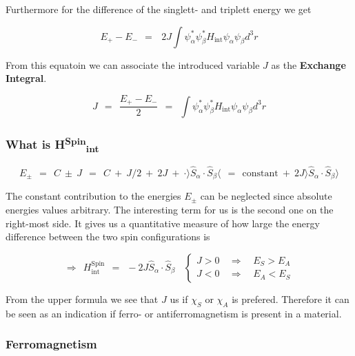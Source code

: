 \documentclass[10pt]{report}
\numberwithin{equation}{chapter}
\begin{document}
Furthermore for the difference of the singlett- and triplett energy we get

\begin{equation}
  E_+ - E_- ~~=~~~2J \int \psi^*_\alpha \psi^*_\beta H_\text{int} \psi_\alpha \psi_\beta d^3r
\end{equation}

From this equatoin we can associate the introduced variable $J$ as the \textbf{Exchange Integral}.

\begin{equation}
  J ~~=~~ \frac{E_+-E_-}{2} ~~=~~ \int \psi^*_\alpha \psi^*_\beta H_\text{int} \psi_\alpha \psi_\beta d^3r
\end{equation}


\subsubsection{What is H\textsuperscript{Spin}\textsubscript{int}}

\begin{equation}
  E_\pm ~~=~~ C ~\pm~ J ~~=~~ C ~+~ J/2 ~+~ 2J ~+~ \cdot \rangle \hat{S}_\alpha \cdot \hat{S}_\beta \langle ~~=~~ \text{constant} ~+~ 2J \rangle \hat{S}_\alpha \cdot \hat{S}_\beta \rangle
\end{equation}

The constant contribution to the energies $E_\pm$ can be neglected since absolute energies values arbitrary. The interesting term for us is the second one on the right-most side. It gives us a quantitative measure of how large the energy difference between the two spin configurations is

\begin{equation}
  \Rightarrow ~~ H^\text{Spin}_\text{int} ~~=~~ - 2J \hat{S}_\alpha \cdot \hat{S}_\beta ~~~~ \left\{
  \begin{array}{lcr}
    J > 0 & ~~ \Rightarrow ~~ & E_S > E_A\\
    J < 0 & ~~ \Rightarrow ~~ & E_A < E_S
  \end{array}\right.
\end{equation}


From the upper formula we see that $J$ us if $\chi_S$ or $\chi_A$ is prefered. Therefore it can be seen as an indication if ferro- or antiferromagnetism is present in a material.


\subsubsection{Ferromagnetism}
\end{document}
